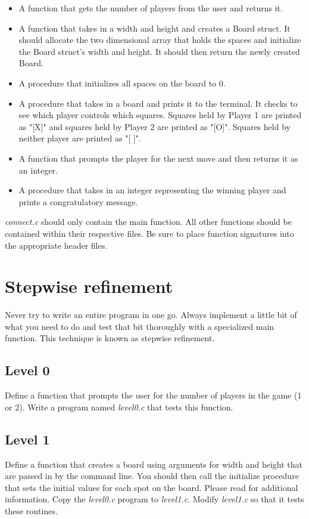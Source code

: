 \documentclass{article}
\begin{document}
\begin{itemize}
\item{A function that gets the number of players from the user and returns it.}
\item{A function that takes in a width and height and creates a Board struct. It should allocate the two dimensional array that holds the spaces and initialize the Board struct's width and height. It should then return the newly created Board.}
\item{A procedure that initializes all spaces on the board to 0.}
\item{A procedure that takes in a board and prints it to the terminal. It checks to see which player controls which squares. Squares held by Player 1 are printed as "[X]" and squares held by Player 2 are printed as "[O]". Squares held by neither player are printed as "[ ]".}
\item{A function that prompts the player for the next move and then returns it as an integer.}
\item{A procedure that takes in an integer representing the winning player and prints a congratulatory message. }
\end{itemize}

{\it connect.c} should only contain the main function. All 
other functions should be contained within their respective files. 
Be sure to place function signatures into the appropriate header files.

\section*{Stepwise refinement}

Never try to write an entire program in one go. Always implement a little bit of what you need to do and test that bit thoroughly with a specialized main function. This technique is known as stepwise refinement.

\subsection*{Level 0}
Define a function that prompts the user for the number of players in the game (1 or 2).
Write a program named {\it level0.c} that tests this function.

\subsection*{Level 1}
Define a function that creates a board using arguments for width and height
that are passed in by the command line. You should then call the initialize procedure that sets the initial values for each spot on the board.
Please read  for additional
information.
Copy the {\it level0.c} program to {\it level1.c}.
Modify {\it level1.c} so that it tests these routines.
\end{document}
